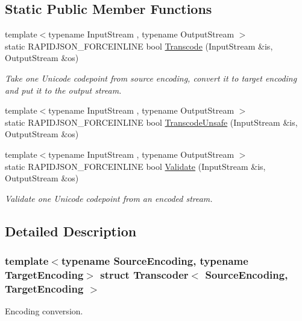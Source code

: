 \subsection*{Static Public Member Functions}
\begin{DoxyCompactItemize}
\item 
{\footnotesize template$<$typename Input\+Stream , typename Output\+Stream $>$ }\\static R\+A\+P\+I\+D\+J\+S\+O\+N\+\_\+\+F\+O\+R\+C\+E\+I\+N\+L\+I\+NE bool \hyperlink{structTranscoder_a0ea2edfe35784ebf1063921d2bd5fb66}{Transcode} (Input\+Stream \&is, Output\+Stream \&os)
\begin{DoxyCompactList}\small\item\em Take one Unicode codepoint from source encoding, convert it to target encoding and put it to the output stream. \end{DoxyCompactList}\item 
{\footnotesize template$<$typename Input\+Stream , typename Output\+Stream $>$ }\\static R\+A\+P\+I\+D\+J\+S\+O\+N\+\_\+\+F\+O\+R\+C\+E\+I\+N\+L\+I\+NE bool \hyperlink{structTranscoder_a16345a912c679b2ea197328eb1444f82}{Transcode\+Unsafe} (Input\+Stream \&is, Output\+Stream \&os)
\item 
{\footnotesize template$<$typename Input\+Stream , typename Output\+Stream $>$ }\\static R\+A\+P\+I\+D\+J\+S\+O\+N\+\_\+\+F\+O\+R\+C\+E\+I\+N\+L\+I\+NE bool \hyperlink{structTranscoder_a8a64aa837f7962894a99f63232472543}{Validate} (Input\+Stream \&is, Output\+Stream \&os)
\begin{DoxyCompactList}\small\item\em Validate one Unicode codepoint from an encoded stream. \end{DoxyCompactList}\end{DoxyCompactItemize}


\subsection{Detailed Description}
\subsubsection*{template$<$typename Source\+Encoding, typename Target\+Encoding$>$\newline
struct Transcoder$<$ Source\+Encoding, Target\+Encoding $>$}

Encoding conversion. 

